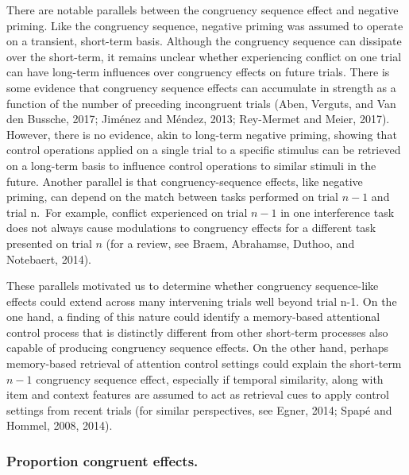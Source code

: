 \documentclass[]{DissertateCUNY}
\begin{document}
There are notable parallels between the congruency sequence effect and
negative priming. Like the congruency sequence, negative priming was
assumed to operate on a transient, short-term basis. Although the
congruency sequence can dissipate over the short-term, it remains
unclear whether experiencing conflict on one trial can have long-term
influences over congruency effects on future trials. There is some
evidence that congruency sequence effects can accumulate in strength as
a function of the number of preceding incongruent trials (Aben, Verguts,
and Van den Bussche, 2017; Jiménez and Méndez, 2013; Rey-Mermet and
Meier, 2017). However, there is no evidence, akin to long-term negative
priming, showing that control operations applied on a single trial to a
specific stimulus can be retrieved on a long-term basis to influence
control operations to similar stimuli in the future. Another parallel is
that congruency-sequence effects, like negative priming, can depend on
the match between tasks performed on trial \(n-1\) and trial n.~For
example, conflict experienced on trial \(n-1\) in one interference task
does not always cause modulations to congruency effects for a different
task presented on trial \(n\) (for a review, see Braem, Abrahamse,
Duthoo, and Notebaert, 2014).

These parallels motivated us to determine whether congruency
sequence-like effects could extend across many intervening trials well
beyond trial n-1. On the one hand, a finding of this nature could
identify a memory-based attentional control process that is distinctly
different from other short-term processes also capable of producing
congruency sequence effects. On the other hand, perhaps memory-based
retrieval of attention control settings could explain the short-term
\(n-1\) congruency sequence effect, especially if temporal similarity,
along with item and context features are assumed to act as retrieval
cues to apply control settings from recent trials (for similar
perspectives, see Egner, 2014; Spapé and Hommel, 2008, 2014).

\hypertarget{proportion-congruent-effects.}{%
\subsubsection{Proportion congruent
effects.}\label{proportion-congruent-effects.}}
\end{document}
